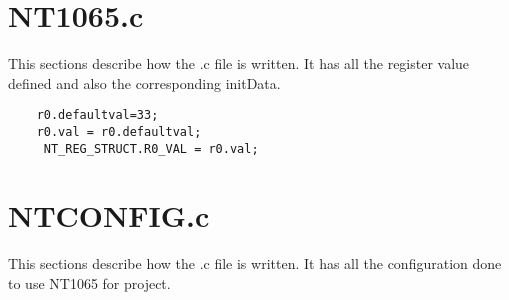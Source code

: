 \documentclass[12pt,a4paper,onecolumn]{article}
\begin{document}
\section{NT1065.c}
This sections describe how the .c file is written. It has all the register value defined and also the corresponding initData. 
\begin{center}
\begin{verbatim}
    r0.defaultval=33;
    r0.val = r0.defaultval;
     NT_REG_STRUCT.R0_VAL = r0.val;
\end{verbatim}
\end{center}
\section{NTCONFIG.c}
This sections describe how the .c file is written. It has all the configuration done to use NT1065 for project. 
\end{document}
